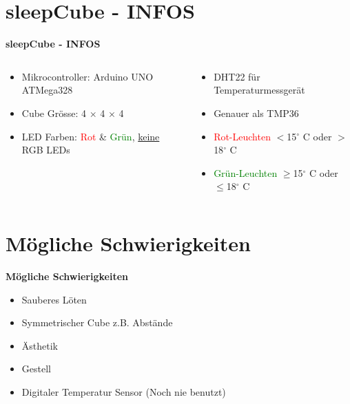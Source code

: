 \documentclass[aspectratio=169]{beamer}
\begin{document}
\section{sleepCube - INFOS} 
\begin{frame}[fragile]
\textbf{sleepCube - INFOS}
\begin{columns}
\begin{column}{0.5\textwidth}
\begin{itemize}
\item Mikrocontroller: Arduino UNO ATMega328
\item Cube Grösse:  4 $\times$ 4 $\times$ 4
\item LED Farben: \textcolor{red}{Rot} \& \textcolor{green}{Grün}, \underline{keine} RGB LEDs

\end{itemize}

\end{column}

\begin{column}{0.5\textwidth}
\begin{itemize}
\item DHT22 für Temperaturmessgerät
\item Genauer als TMP36
\item \textcolor{red}{Rot-Leuchten} $<$15$^{\circ}$ C oder $>$18$^{\circ}$ C
\item \textcolor{green}{Grün-Leuchten} $\geq$15$^{\circ}$ C oder $\leq$18$^{\circ}$ C
\end{itemize}
\end{column}

\end{columns}
\end{frame}

\section{Mögliche Schwierigkeiten} 
\begin{frame}[fragile]
\textbf{Mögliche Schwierigkeiten}
\begin{itemize}
\item Sauberes Löten
\item Symmetrischer Cube z.B. Abstände
\item Ästhetik
\item Gestell 
\item Digitaler Temperatur Sensor (Noch nie benutzt)
\end{itemize}
\begin{columns}
\begin{column}{0.45\textwidth}


\end{column}
\begin{column}{0.5\textwidth}

\end{column}

\end{columns}
\end{frame}
\end{document}
